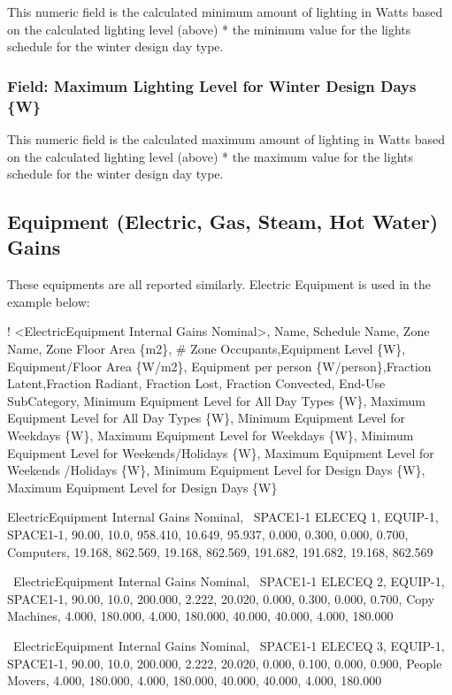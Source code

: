 This numeric field is the calculated minimum amount of lighting in Watts based on the calculated lighting level (above) * the minimum value for the lights schedule for the winter design day type.

\subsubsection{Field: Maximum Lighting Level for Winter Design Days \{W\}}\label{field-maximum-lighting-level-for-winter-designdays-w}

This numeric field is the calculated maximum amount of lighting in Watts based on the calculated lighting level (above) * the maximum value for the lights schedule for the winter design day type.

\subsection{Equipment (Electric, Gas, Steam, Hot Water) Gains}\label{equipment-electric-gas-steam-hot-water-gains}

These equipments are all reported similarly. Electric Equipment is used in the example below:

! \textless{}ElectricEquipment Internal Gains Nominal\textgreater{}, Name, Schedule Name, Zone Name, Zone Floor Area \{m2\}, \# Zone Occupants,Equipment Level \{W\}, Equipment/Floor Area \{W/m2\}, Equipment per person \{W/person\},Fraction Latent,Fraction Radiant, Fraction Lost, Fraction Convected, End-Use SubCategory, Minimum Equipment Level for All Day Types \{W\}, Maximum Equipment Level for All Day Types \{W\}, Minimum Equipment Level for Weekdays \{W\}, Maximum Equipment Level for Weekdays \{W\}, Minimum Equipment Level for Weekends/Holidays \{W\}, Maximum Equipment Level for Weekends /Holidays \{W\}, Minimum Equipment Level for Design Days \{W\}, Maximum Equipment Level for Design Days \{W\}

ElectricEquipment Internal Gains Nominal,~ SPACE1-1 ELECEQ 1, EQUIP-1, SPACE1-1, 90.00, 10.0, 958.410, 10.649, 95.937, 0.000, 0.300, 0.000, 0.700, Computers, 19.168, 862.569, 19.168, 862.569, 191.682, 191.682, 19.168, 862.569

~ElectricEquipment Internal Gains Nominal,~ SPACE1-1 ELECEQ 2, EQUIP-1, SPACE1-1, 90.00, 10.0, 200.000, 2.222, 20.020, 0.000, 0.300, 0.000, 0.700, Copy Machines, 4.000, 180.000, 4.000, 180.000, 40.000, 40.000, 4.000, 180.000

~ElectricEquipment Internal Gains Nominal,~ SPACE1-1 ELECEQ 3, EQUIP-1, SPACE1-1, 90.00, 10.0, 200.000, 2.222, 20.020, 0.000, 0.100, 0.000, 0.900, People Movers, 4.000, 180.000, 4.000, 180.000, 40.000, 40.000, 4.000, 180.000

